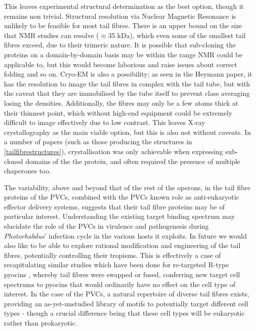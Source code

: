 This leaves experimental structural determination as the best option, though it remains non trivial. Structural resolution via Nuclear Magnetic Resonance is unlikely to be feasible for most tail fibres. There is an upper bound on the size that NMR studies can resolve ($\approx$35 kDa), which even some of the smallest tail fibres exceed, due to their trimeric nature. It is possible that sub-cloning the proteins on a domain-by-domain basis may be within the range NMR could be applicable to, but this would become laborious and raise issues about correct folding and so on. Cryo-EM is also a possibility; as seen in the Heymann paper, it has the resolution to image the tail fibres in complex with the tail tube, but with the caveat that they are immobilised by the tube itself to prevent class averaging losing the densities. Additionally, the fibres may only be a few atoms thick at their thinnest point, which without high-end equipment could be extremely difficult to image effectively due to low contrast. This leaves X-ray crystallography as the main viable option, but this is also not without caveats. In a number of papers (such as those producing the structures in \vref{tailfibrestructures}), crystallisation was only achievable when expressing sub-cloned domains of the the protein, and often required the presence of multiple chaperones too.

The variability, above and beyond that of the rest of the operons, in the tail fibre proteins of the PVCs, combined with the PVCs known role as anti-eukaryotic effector delivery systems, suggests that their tail fibre proteins may be of particular interest. Understanding the existing target binding spectrum may elucidate the role of the PVCs in virulence and pathogenesis during \emph{Photorhabdus}' infection cycle in the various hosts it exploits. In future we would also like to be able to explore rational modification and engineering of the tail fibres, potentially controlling their tropisms. This is effectively a case of recapitulating similar studies which have been done for re-targeted R-type pyocins \citep{Scholl2009a}, whereby tail fibres were swapped or fused, conferring new target cell spectrums to pyocins that would ordinarily have no effect on the cell type of interest. In the case of the PVCs, a natural repertoire of diverse tail fibres exists, providing an as-yet-unstudied library of motifs to potentially target different cell types - though a crucial difference being that these cell types will be eukaryotic rather than prokaryotic.

